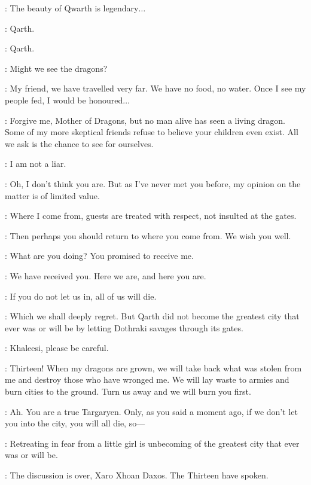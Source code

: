 \DAENERYS: The beauty of Qwarth is legendary$\ldots$  

\SPICEKING:  Qarth. 

\DAENERYS: Qarth. 

\SPICEKING: Might we see the dragons? 

\DAENERYS: My friend, we have travelled very far. We have no food, no water. Once I see my people fed, I would be honoured$\ldots$  

\SPICEKING: Forgive me, Mother of Dragons, but no man alive has seen a living dragon. Some of my more skeptical friends refuse to believe your children even exist. All we ask is the chance to see for ourselves. 

\DAENERYS: I am not a liar. 

\SPICEKING: Oh, I don't think you are. But as I've never met you before, my opinion on the matter is of limited value. 

\DAENERYS: Where I come from, guests are treated with respect, not insulted at the gates. 

\SPICEKING: Then perhaps you should return to where you come from. We wish you well. 


\DAENERYS: What are you doing? You promised to receive me. 

\SPICEKING: We have received you. Here we are, and here you are. 

\DAENERYS: If you do not let us in, all of us will die. 

\SPICEKING: Which we shall deeply regret. But Qarth did not become the greatest city that ever was or will be by letting Dothraki savages through its gates. 

\JORAH: Khaleesi, please be careful. 

\DAENERYS: Thirteen!  When my dragons are grown, we will take back what was stolen from me and destroy those who have wronged me. We will lay waste to armies and burn cities to the ground. Turn us away and we will burn you first. 

\SPICEKING: Ah. You are a true Targaryen. Only, as you said a moment ago, if we don't let you into the city, you will all die, so---

\XARO:  Retreating in fear from a little girl is unbecoming of the greatest city that ever was or will be.

\SPICEKING: The discussion is over, Xaro Xhoan Daxos. The Thirteen have spoken. 

